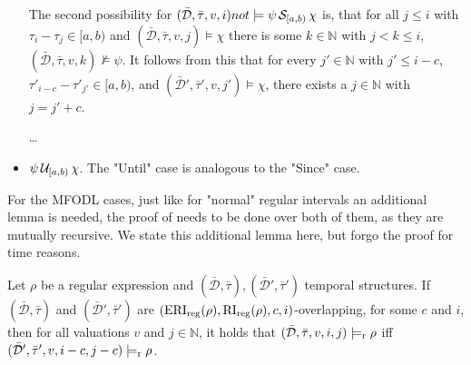 \begin{itemize}
        The second possibility for $(\bar{\mathcal{D}}, \bar{\tau}, v, i) not\models \psi \,\mathcal{S}_{[a,b)}\, \chi$ is, that for all $j \leq i$ with $\tau_i - \tau_j \in [a,b)$ and $(\bar{\mathcal{D}}, \bar{\tau}, v, j) \models \chi$ there is some $k \in \mathbb{N}$ with $j < k \leq i$, $(\bar{\mathcal{D}}, \bar{\tau}, v, k) \not\models \psi$.
        It follows from this that for every $j' \in \mathbb{N}$ with $j' \leq i-c$, $\tau'_{i-c} - \tau'_{j'} \in [a,b)$, and $(\bar{\mathcal{D}}', \bar{\tau}', v, j') \models \chi$, there exists a $j \in \mathbb{N}$ with $j = j' + c$.


        \dots


    \item
        $\psi \,\mathcal{U}_{[a,b)}\, \chi$.
        The "Until" case is analogous to the "Since" case.
\end{itemize}


For the MFODL cases, just like for "normal" regular intervals an additional lemma is needed, the proof of needs to be done over both of them, as they are mutually recursive.
We state this additional lemma here, but forgo the proof for time reasons.

\begin{lemma}
    \label{lem:eri-completness-reg}
    Let $\rho$ be a regular expression and $(\bar{\mathcal{D}}, \bar{\tau}), (\bar{\mathcal{D}}', \bar{\tau}')$ temporal structures.
    If $(\bar{\mathcal{D}}, \bar{\tau})$ and $(\bar{\mathcal{D}}', \bar{\tau}')$ are $(\operatorname{ERI}_{\text{reg}}(\rho),\operatorname{RI}_{\text{reg}}(\rho),c,i)$-overlapping, for some $c$ and $i$, then for all valuations $v$ and $j \in \mathbb{N}$, it holds that $(\bar{\mathcal{D}}, \bar{\tau},v,i,j) \models_{\text{r}} \rho$ iff $(\bar{\mathcal{D}}',\bar{\tau}',v,i-c,j-c) \models_{\text{r}} \rho$.
\end{lemma}